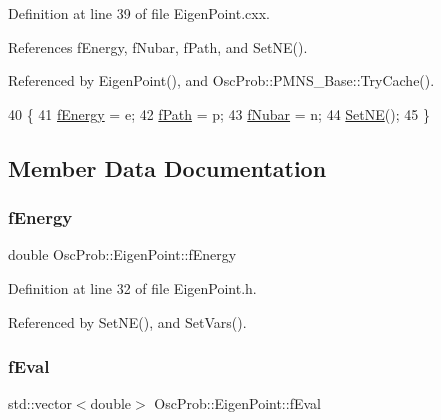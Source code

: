 Definition at line 39 of file Eigen\+Point.\+cxx.



References f\+Energy, f\+Nubar, f\+Path, and Set\+N\+E().



Referenced by Eigen\+Point(), and Osc\+Prob\+::\+P\+M\+N\+S\+\_\+\+Base\+::\+Try\+Cache().


\begin{DoxyCode}
40 \{
41   \hyperlink{structOscProb_1_1EigenPoint_a539fc09adbccea30cf2eb4bf7d0b3a6c}{fEnergy} = e;
42   \hyperlink{structOscProb_1_1EigenPoint_a1c263b6ceef5bd4de3181182f944efbb}{fPath} = p;
43   \hyperlink{structOscProb_1_1EigenPoint_a42655458f601a178afca216036e7b7d8}{fNubar} = n;
44   \hyperlink{structOscProb_1_1EigenPoint_a30abf0fdf72716458bcf530bd3b806b0}{SetNE}();
45 \}
\end{DoxyCode}


\subsection{Member Data Documentation}
\mbox{\label{structOscProb_1_1EigenPoint_a539fc09adbccea30cf2eb4bf7d0b3a6c}} 
\subsubsection{\texorpdfstring{f\+Energy}{fEnergy}}
{\footnotesize\ttfamily double Osc\+Prob\+::\+Eigen\+Point\+::f\+Energy}



Definition at line 32 of file Eigen\+Point.\+h.



Referenced by Set\+N\+E(), and Set\+Vars().

\mbox{\label{structOscProb_1_1EigenPoint_a5c5e729d82e3aca1964c1777f4882f9d}} 
\subsubsection{\texorpdfstring{f\+Eval}{fEval}}
{\footnotesize\ttfamily std\+::vector$<$double$>$ Osc\+Prob\+::\+Eigen\+Point\+::f\+Eval}



